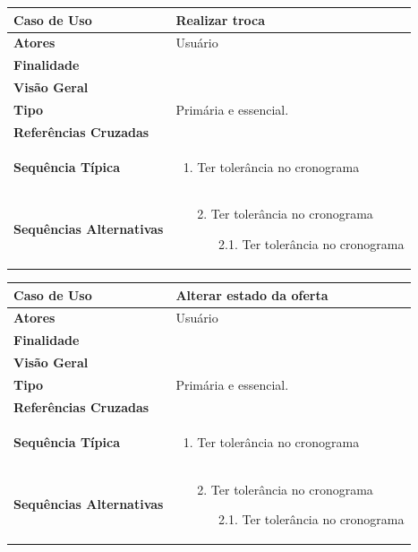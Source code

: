 \documentclass[a4paper,11pt]{article}
\begin{document}
\begin{table}[H]
		\begin{tabularx}{\textwidth}{|l|X|}
		\hline
			\textbf{Caso de Uso} &  Realizar troca \\ \hline
			\textbf{Atores} &  Usuário  \\ \hline
			\textbf{Finalidade} &   \\ \hline
			\textbf{Visão Geral} &  \\ \hline
			\textbf{Tipo} & Primária e essencial. \\ \hline
			\textbf{Referências Cruzadas} &  \\ \hline
			\textbf{Sequência Típica} & 
			\begin{enumerate}
			\item Ter tolerância no cronograma
			\end{enumerate} \\ \hline
			
			\textbf{Sequências Alternativas} & 
			\begin{itemize}
				\item[2.] Ter tolerância no cronograma
				\begin{itemize}
					\item[2.1.] Ter tolerância no cronograma
				\end{itemize}
			\end{itemize} \\ \hline
		\end{tabularx}
\end{table}

\begin{table}[H]
		\begin{tabularx}{\textwidth}{|l|X|}
		\hline
			\textbf{Caso de Uso} &  Alterar estado da oferta \\ \hline
			\textbf{Atores} &  Usuário  \\ \hline
			\textbf{Finalidade} &   \\ \hline
			\textbf{Visão Geral} &  \\ \hline
			\textbf{Tipo} & Primária e essencial. \\ \hline
			\textbf{Referências Cruzadas} &  \\ \hline
			\textbf{Sequência Típica} & 
			\begin{enumerate}
			\item Ter tolerância no cronograma
			\end{enumerate} \\ \hline
			
			\textbf{Sequências Alternativas} & 
			\begin{itemize}
				\item[2.] Ter tolerância no cronograma
				\begin{itemize}
					\item[2.1.] Ter tolerância no cronograma
				\end{itemize}
			\end{itemize} \\ \hline
		\end{tabularx}
\end{table}
\end{document}
